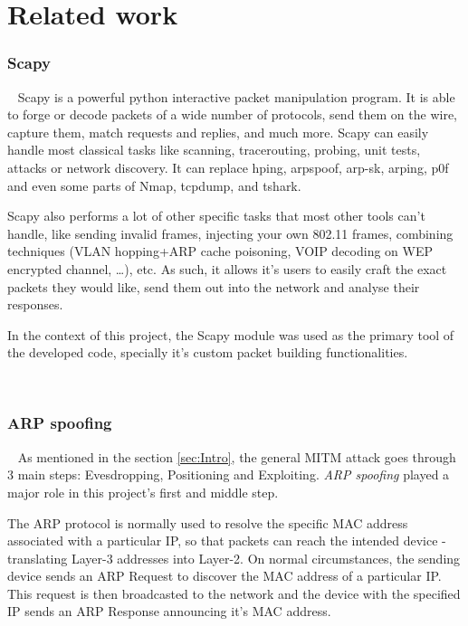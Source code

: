 \section{Related work}

\subsubsection{Scapy}

~\newline
Scapy is a powerful python interactive packet manipulation program. 
It is able to forge or decode packets of a wide number of protocols, send them on the wire, capture them, match requests and replies, and much more. 
Scapy can easily handle most classical tasks like scanning, tracerouting, probing, unit tests, attacks or network discovery. 
It can replace hping, arpspoof, arp-sk, arping, p0f and even some parts of Nmap,
tcpdump, and tshark.

Scapy also performs a lot of other specific tasks that most other tools can’t 
handle, like sending invalid frames, injecting your own 802.11 frames, 
combining techniques (VLAN hopping+ARP cache poisoning, VOIP decoding on WEP 
encrypted channel, …), etc.
As such, it allows it's users to easily craft the exact packets they would like,
send them out into the network and analyse their responses.

In the context of this project, the Scapy module was used as the primary tool 
of the developed code, specially it's custom packet building functionalities.

~
\subsubsection{ARP spoofing}

~\newline
As mentioned in the section \ref{sec:Intro}, the general MITM attack goes 
through 3 main steps: Evesdropping, Positioning and Exploiting. 
\textit{ARP spoofing} played a major role in this project's first and middle 
step.

The ARP protocol is normally used to resolve the specific MAC address associated
with a particular IP, so that packets can reach the intended device - 
translating Layer-3 addresses into Layer-2.
On normal circumstances, the sending device sends an ARP Request to discover the
MAC address of a particular IP.
This request is then broadcasted to the network and the device with the 
specified IP sends an ARP Response announcing it's MAC address.

